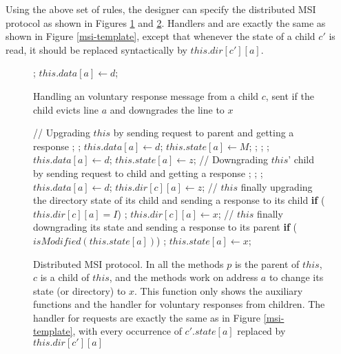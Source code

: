 Using the above set of rules, the designer can specify the distributed MSI protocol as shown in
Figures \ref{msi-unsolicited} and \ref{realistic}. Handlers \uReq{} and \dReq{} are exactly the same as
shown in Figure \ref{msi-template}, except that whenever the state of a child
$c'$ is read, it should be replaced syntactically by $this.dir[c'][a]$.

\begin{figure}
\small
\begin{algorithmic}
    \State \receive{} ;
    \State $this.data[a] \gets d$;
  \EndIf
\EndProc
\end{algorithmic}
\caption{Handling an voluntary response message from a child $c$, sent if the
child evicts line $a$ and downgrades the line to $x$}
\label{msi-unsolicited}
\end{figure}

\begin{figure}
\small

\begin{algorithmic}
\State // Upgrading $this$ by sending request to parent and getting a response
    \State \send{} ;
    \State \receive{} ;
    \State $this.data[a] \gets d$;
    \State $this.state[a] \gets M$;
  \Else
  \State \send{} ;
  \State \receive{} ;
    \State \receive{} ;
    \State $this.data[a] \gets d$;
  \EndIf
  \State $this.state[a] \gets z$;
  \EndIf
\EndProc
\State // Downgrading $this$' child by sending request to child and getting a
response
  \State \send{} ;
  \State \receive{} ;
    \State \receive{} ;
    \State $this.data[a] \gets d$;
  \EndIf
  \State $this.dir[c][a] \gets z$;
\EndProc
\State // $this$ finally upgrading the directory state of its child and sending
a response to its child
  \State \textbf{if} ($this.dir[c][a] = I$)
  \State \;\;\;\; \send{} ;
  \State $this.dir[c][a] \gets x$;
\EndProc
\State // $this$ finally downgrading its state and sending a response to its
parent
  \State \textbf{if} ($isModified(this.state[a])$)
  \State \;\;\;\; \send{} ;
  \State $this.state[a] \gets x$;
\EndProc
\end{algorithmic}
\caption{Distributed MSI protocol. In all the methods $p$ is the parent of
$this$, $c$ is a child of $this$, and the methods work on address $a$ to change
its state (or directory) to $x$. This function only shows the auxiliary
functions and the handler for voluntary responses from children. The handler
for requests are exactly the same as in Figure \ref{msi-template}, with every
occurrence of $c'.state[a]$ replaced by $this.dir[c'][a]$}
\label{realistic}
\end{figure}

